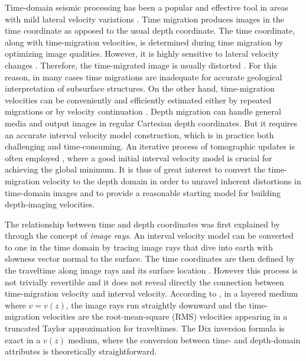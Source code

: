 Time-domain seismic processing has been a popular and effective tool in areas with mild lateral velocity 
variations \cite[]{yilmaz,robein,bartel}. Time migration produces images in the time 
coordinate as opposed to the usual depth coordinate. The time coordinate, along with time-migration velocities, is 
determined during time migration by optimizing image qualities. However, it is highly sensitive to lateral 
velocity changes \cite[]{black,bevc2}. Therefore, the time-migrated image is usually 
distorted \cite[]{hubral,cameron1,cameron2,cameron3,iversen}. For this reason, in many cases time migrations are 
inadequate for accurate geological interpretation of subsurface structures. On the other hand, time-migration 
velocities can be conveniently and efficiently estimated either by repeated migrations \cite[]{yilmaz2} or by 
velocity continuation \cite[]{fomel1}. Depth migration can handle general media and output 
images in regular Cartesian depth coordinates. But it requires an accurate interval 
velocity model construction, which is in practice both challenging and time-consuming. An iterative process of 
tomographic updates is often employed \cite[]{bishop,stork}, where a good initial interval velocity model is 
crucial for achieving the global minimum. It is thus of great interest to convert the time-migration velocity 
to the depth domain in order to unravel inherent distortions in time-domain images and to provide a reasonable 
starting model for building depth-imaging velocities.

The relationship between time and depth coordinates was first explained by \cite{hubral} through the concept of 
\textit{image rays}. An interval velocity model can be converted to one in the time domain by 
tracing image rays that dive into earth with slowness vector normal to the surface. The time 
coordinates are then defined by the traveltime along image rays and its surface location 
\cite[]{larner,robein}. However this process is not trivially revertible and it does not reveal directly the 
connection between time-migration velocity and interval velocity. 
According to \cite{dix}, in a layered medium where $v = v(z)$, the image rays run straightly 
downward and the time-migration velocities are the root-mean-square (RMS) velocities appearing in a truncated 
Taylor approximation for traveltimes. The Dix inversion formula is exact in a $v(z)$ medium, where the conversion 
between time- and depth-domain attributes is theoretically straightforward.

